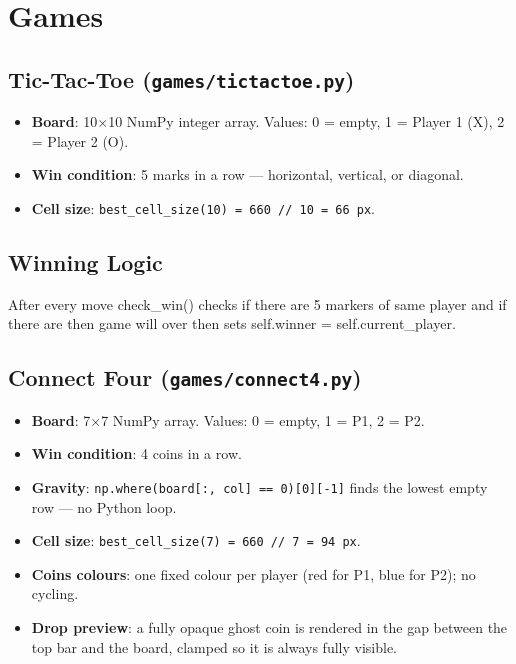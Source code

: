 \documentclass[12pt, letterpaper]{article}
\begin{document}
\section{Games}

\subsection{Tic-Tac-Toe (\texttt{games/tictactoe.py})}

\begin{itemize}
    \item \textbf{Board}: 10$\times$10 NumPy integer array. Values: 0 = empty,
          1 = Player 1 (X), 2 = Player 2 (O).
    \item \textbf{Win condition}: 5 marks in a row --- horizontal, vertical,
          or diagonal.
    \item \textbf{Cell size}: \texttt{best\_cell\_size(10) = 660 // 10 = 66 px}.
\end{itemize}

\subsection*{Winning Logic}

After every move check_win() checks if there are 5 markers of same player and if there are then game will over then sets self.winner = self.current_player.


\subsection{Connect Four (\texttt{games/connect4.py})}

\begin{itemize}
    \item \textbf{Board}: 7$\times$7 NumPy array. Values: 0 = empty, 1 = P1,
          2 = P2.
    \item \textbf{Win condition}: 4 coins in a row.
    \item \textbf{Gravity}: \texttt{np.where(board[:, col] == 0)[0][-1]} finds
          the lowest empty row --- no Python loop.
    \item \textbf{Cell size}: \texttt{best\_cell\_size(7) = 660 // 7 = 94 px}.
    \item \textbf{Coins colours}: one fixed colour per player
          (red for P1, blue for P2); no cycling.
    \item \textbf{Drop preview}: a fully opaque ghost coin is rendered in the
          gap between the top bar and the board, clamped so it is always fully
          visible.
\end{itemize}
\end{document}
